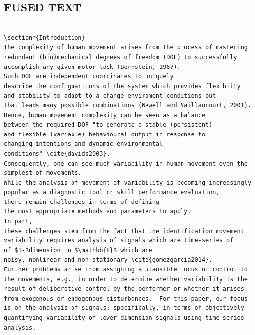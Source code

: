 \documentclass[10pt]{article}
\begin{document}
\subsection{FUSED TEXT}
\begin{verbatim}

\section*{Introduction}
The complexity of human movement arises from the process of mastering 
redundant (bio)mechanical degrees of freedom (DOF) to successfully 
accomplish any given motor task (Bernstein, 1967).
Such DOF are independent coordinates to uniquely 
describe the configuartions of the system which provides flexibiity 
and stability to adapt to a change enviroment conditions but 
that leads many possible combinations (Newell and Vaillancourt, 2001).
Hence, human movement complexity can be seen as a balance 
between the required DOF "to generate a stable (persistent) 
and flexible (variable) behavioural output in response to 
changing intentions and dynamic environmental
conditions" \cite{davids2003}. 
Consequently, one can see much variability in human movement even the 
simplest of movements.  
While the analysis of movement of variability is becoming increasingly 
popular as a diagnostic tool or skill performance evaluation, 
there remain challenges in terms of defining 
the most appropriate methods and parameters to apply. 
In part, 
these challenges stem from the fact that the identification movement 
variability requires analysis of signals which are time-series of 
of $1-$dimension in $\mathbb{R}$ which are 
noisy, nonlinear and non-stationary \cite{gomezgarcia2014}.
Further problems arise from assigning a plausible locus of control to 
the movements, e.g., in order to determine whether variability is the 
result of deliberative control by the performer or whether it arises 
from exogenous or endogenous disturbances.  For this paper, our focus 
is on the analysis of signals; specifically, in terms of objectively 
quantifying variability of lower dimension signals using time-series analysis.


\end{verbatim}
\end{document}
